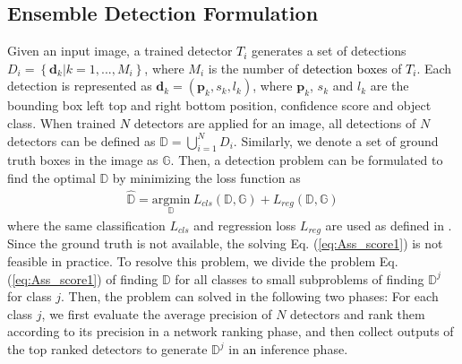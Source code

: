 \documentclass[10pt,twocolumn,letterpaper]{article}
\newcommand{\RV}{\textcolor{black}}
\begin{document}
\subsection{Ensemble Detection Formulation}
Given an input image, a trained detector \RV{$T_{i}$} generates a set of detections $D_{i} = \left\{\mathbf{d}_{k}|k=1, ...,M_{i}\right\}$, where $M_{i}$ is the number of \RV{detection boxes} of \RV{$T_{i}$}. 
Each detection is represented as $\mathbf{d}_{k}=(\mathbf{p}_{k}, s_{k}, l_{k})$, where $\mathbf{p}_{k}$, $s_{k}$ and $l_{k}$ are the bounding box left top and right bottom position, confidence score and object class.  
When trained \RV{$N$} detectors are applied for an image, all detections of $N$ detectors can be defined as $\mathbb{D}= \bigcup_{i=1}^{N} D_{i}$. Similarly, we denote a set of ground truth boxes in the image as $\mathbb{G}$. Then, a detection problem can be formulated to find the optimal $\mathbb{D}$ by minimizing the loss function as 
%
\begin{equation}\label{eq:Ass_score1} 
\begin{array}{lc} 
\hat{\mathbb{D}} = \underset{\mathbb{D}}{\text{argmin}}~L_{cls}(\mathbb{D}, \mathbb{G}) + L_{reg}(\mathbb{D}, \mathbb{G})
\end{array}
\end{equation}
%
where the same classification $L_{cls}$ and regression loss  $L_{reg}$ are used as defined in \cite{Girshick15_ICCV15}. Since the ground truth is not available, the solving Eq. (\ref{eq:Ass_score1}) is not feasible in practice. To resolve this problem,  we divide the problem Eq. (\ref{eq:Ass_score1}) of finding ${\mathbb{D}}$ for all classes to small subproblems of finding $\mathbb{D}^{j}$ for class $j$. Then, the problem can solved in the following two phases: For each class $j$, we first evaluate the average precision of $N$ detectors and rank them according to its precision in a network ranking phase, and then collect outputs of the top ranked detectors to generate $\mathbb{D}^{j}$ in \RV{an} inference phase.  

\end{document}
